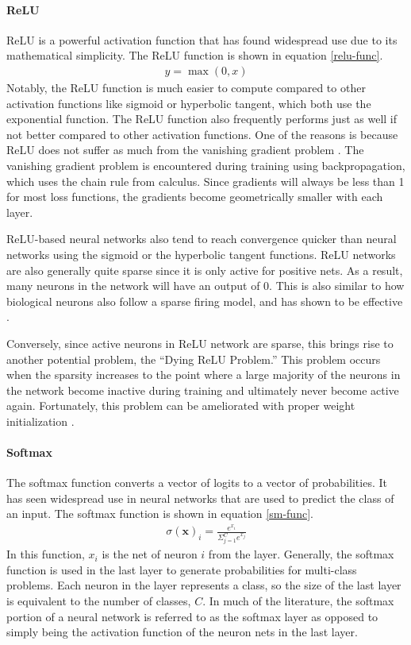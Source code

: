 \paragraph{ReLU}
ReLU is a powerful activation function that has found widespread use due to its mathematical simplicity. The ReLU function is shown in equation \ref{relu-func}.
\begin{align}
y = \max(0, x) \label{relu-func}
\end{align}
Notably, the ReLU function is much easier to compute compared to other activation functions like sigmoid or hyperbolic tangent, which both use the exponential function. The ReLU function also frequently performs just as well if not better compared to other activation functions. One of the reasons is because ReLU does not suffer as much from the vanishing gradient problem \cite{pmlr-v15-glorot11a}. The vanishing gradient problem is encountered during training using backpropagation, which uses the chain rule from calculus. Since gradients will always be less than 1 for most loss functions, the gradients become geometrically smaller with each layer. 

ReLU-based neural networks also tend to reach convergence quicker than neural networks using the sigmoid or the hyperbolic tangent functions. ReLU networks are also generally quite sparse since it is only active for positive nets. As a result, many neurons in the network will have an output of 0. This is also similar to how biological neurons also follow a sparse firing model, and has shown to be effective \cite{pmlr-v15-glorot11a}. 

Conversely, since active neurons in ReLU network are sparse, this brings rise to another potential problem, the ``Dying ReLU Problem.'' This problem occurs when the sparsity increases to the point where a large majority of the neurons in the network become inactive during training and ultimately never become active again. Fortunately, this problem can be ameliorated with proper weight initialization \cite{Lu2019DyingRA}.

\paragraph{Softmax}
The softmax function converts a vector of logits to a vector of probabilities. It has seen widespread use in neural networks that are used to predict the class of an input. The softmax function is shown in equation \ref{sm-func}.
\begin{align}
\sigma(\mathbf{x})_i = \frac{e^{x_i}}{\Sigma_{j=1}^C e^{x_j}} \label{sm-func}
\end{align}
In this function, $x_i$ is the net of neuron $i$ from the layer. Generally, the softmax function is used in the last layer to generate probabilities for multi-class problems. Each neuron in the layer represents a class, so the size of the last layer is equivalent to the number of classes, $C$. In much of the literature, the softmax portion of a neural network is referred to as the softmax layer as opposed to simply being the activation function of the neuron nets in the last layer.


